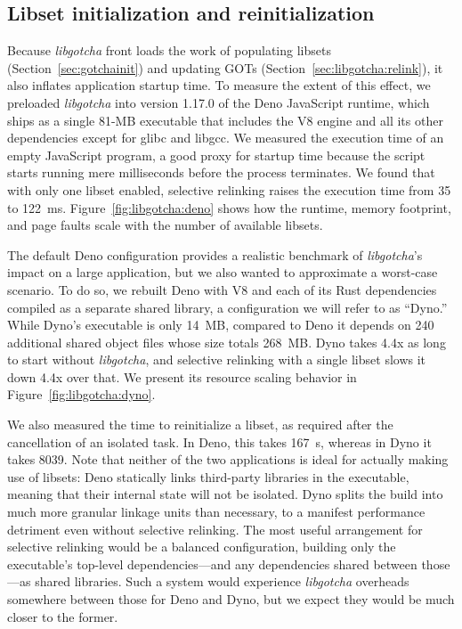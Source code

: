 \subsection{Libset initialization and reinitialization}

Because \textit{libgotcha} front loads the work of populating libsets
(Section~\ref{sec:gotchainit}) and updating GOTs
(Section~\ref{sec:libgotcha:relink}), it also inflates application startup time.  To
measure the extent of this effect, we preloaded \textit{libgotcha} into version
1.17.0 of the Deno JavaScript runtime, which ships as a single 81-MB executable that
includes the V8 engine and all its other dependencies except for glibc and libgcc.
We measured the execution time of an empty JavaScript program, a good proxy for
startup time because the script starts running mere milliseconds before the process
terminates.  We found that with only one libset enabled, selective relinking raises
the execution time from 35 to 122~ms.  Figure~\ref{fig:libgotcha:deno} shows how the
runtime, memory footprint, and page faults scale with the number of available
libsets.

The default Deno configuration provides a realistic benchmark of \textit{libgotcha}'s
impact on a large application, but we also wanted to approximate a worst-case
scenario.  To do so, we rebuilt Deno with V8 and each of its Rust dependencies
compiled as a separate shared library, a configuration we will refer to as ``Dyno.''
While Dyno's executable is only 14~MB, compared to Deno it depends on 240 additional
shared object files whose size totals 268~MB.  Dyno takes 4.4x as long to start
without \textit{libgotcha}, and selective relinking with a single libset slows it
down 4.4x over that.  We present its resource scaling behavior in
Figure~\ref{fig:libgotcha:dyno}.

We also measured the time to reinitialize a libset, as required after the
cancellation of an isolated task.  In Deno, this takes 167~\textmu{}s, whereas in
Dyno it takes 8039.  Note that neither of the two applications is ideal for actually
making use of libsets:  Deno statically links third-party libraries in the
executable, meaning that their internal state will not be isolated.  Dyno splits the
build into much more granular linkage units than necessary, to a manifest performance
detriment even without selective relinking.  The most useful arrangement for
selective relinking would be a balanced configuration, building only the executable's
top-level dependencies---and any dependencies shared between those---as shared
libraries.  Such a system would experience \textit{libgotcha} overheads somewhere
between those for Deno and Dyno, but we expect they would be much closer to the
former.


